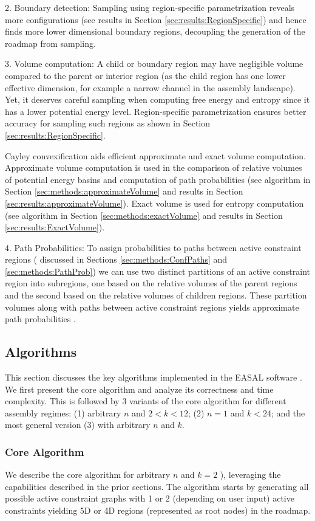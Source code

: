 \documentclass[]{article}
\newcommand{\rahul}[1]{\color{black}{#1}\color{black}}
\begin{document}
2. Boundary detection:
Sampling using region-specific parametrization reveals more configurations (see
results in Section \ref{sec:results:RegionSpecific}) and hence finds more lower
dimensional boundary regions, decoupling the generation of the roadmap from
sampling. 

3. Volume computation: A child or boundary region may have negligible volume
compared to the parent or interior region (as the child region has one lower
effective dimension, for example a narrow channel in the assembly landscape).
Yet, it deserves careful sampling when computing free energy and entropy since
it has a lower potential energy level.  Region-specific parametrization ensures
better accuracy for sampling such regions as shown in Section
\ref{sec:results:RegionSpecific}.

Cayley convexification aids efficient approximate and exact volume computation.
Approximate volume computation is used in the comparison of relative volumes of
potential energy basins and computation of path probabilities (see algorithm in
Section \ref{sec:methods:approximateVolume} and results in Section
\ref{sec:results:approximateVolume}). Exact volume is used for entropy
computation (see algorithm in Section \ref{sec:methods:exactVolume} and results
in Section \ref{sec:results:ExactVolume}).

4. Path Probabilities:
To assign probabilities to paths between active constraint regions (
discussed in Sections \ref{sec:methods:ConfPaths} and
\ref{sec:methods:PathProb}) we can use 
two distinct partitions of an active
constraint region into subregions, one based on the relative volumes of the
parent regions and the second based on the relative volumes of children
regions. These partition volumes along with paths between active constraint
regions yields approximate path probabilities .

\subsection{Algorithms}
\label{sec:algorithms}
This section discusses the key algorithms implemented in the EASAL software
\cite{Ozkan:toms, easalVideo, easalSoftware}. We first present the core
algorithm and analyze its correctness and time complexity. This is followed by
3 variants of the core algorithm for different assembly regimes: (1) arbitrary
$n$ and $2<k<12$; (2) $n=1$ and $k<24$; and the most general version (3) with
arbitrary $n$ and $k$.

\subsubsection{Core Algorithm}
\label{sec:coreAlgorithm}
We describe the core algorithm for arbitrary $n$ and $k=2$ \rahul{(Algorithm
\ref{alg:sampleAtlasNode} in Section \ref{sec:app:algorithm} of the Appendix}),
leveraging the capabilities described in the prior sections.  The algorithm
starts by generating all possible active constraint graphs with 1 or 2
(depending on user input) active constraints yielding 5D or 4D regions
(represented as root nodes) in the roadmap.
\end{document}
